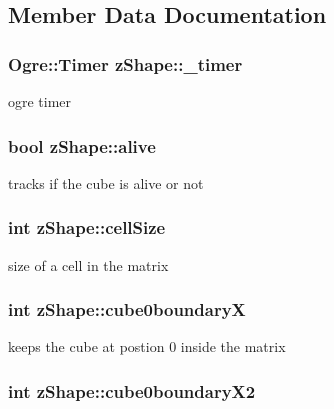 \subsection{Member Data Documentation}
\hypertarget{classz_shape_a2e34a7774c32ab986afcb352bee6de9b}{
\subsubsection[{\-\_\-timer}]{\setlength{\rightskip}{0pt plus 5cm}Ogre\-::\-Timer z\-Shape\-::\-\_\-timer}}\label{classz_shape_a2e34a7774c32ab986afcb352bee6de9b}
ogre timer \hypertarget{classz_shape_a1796431468e8e0b2073e28d94bc4c5bd}{
\subsubsection[{alive}]{\setlength{\rightskip}{0pt plus 5cm}bool z\-Shape\-::alive}}\label{classz_shape_a1796431468e8e0b2073e28d94bc4c5bd}
tracks if the cube is alive or not \hypertarget{classz_shape_a0437d50ec76bf6fbe2522ead9b3184e0}{
\subsubsection[{cell\-Size}]{\setlength{\rightskip}{0pt plus 5cm}int z\-Shape\-::cell\-Size}}\label{classz_shape_a0437d50ec76bf6fbe2522ead9b3184e0}
size of a cell in the matrix \hypertarget{classz_shape_ab573e49ed92efb74eea99eeb6015a8f0}{
\subsubsection[{cube0boundary\-X}]{\setlength{\rightskip}{0pt plus 5cm}int z\-Shape\-::cube0boundary\-X}}\label{classz_shape_ab573e49ed92efb74eea99eeb6015a8f0}
keeps the cube at postion 0 inside the matrix \hypertarget{classz_shape_a40fae2a3019c20406dc8dbbc9613becf}{
\subsubsection[{cube0boundary\-X2}]{\setlength{\rightskip}{0pt plus 5cm}int z\-Shape\-::cube0boundary\-X2}}\label{classz_shape_a40fae2a3019c20406dc8dbbc9613becf}
